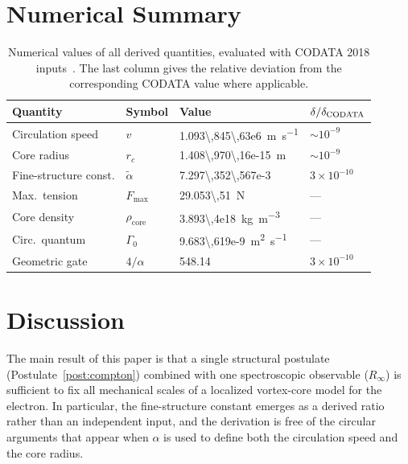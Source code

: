 \documentclass[aps,pra,preprint,longbibliography,nofootinbib]{revtex4-2}
\newcommand{\vc}{v}              %
\newcommand{\rc}{r_c}            %
\newcommand{\Rinf}{R_\infty}     %
\newcommand{\Fmax}{F_{\max}}     %
\newcommand{\rhocore}{\rho_{\mathrm{core}}} %
\newcommand{\Gz}{\Gamma_0}       %
\begin{document}
\section{Numerical Summary}
\label{sec:numerical}

\begin{table}[h]
\centering
\caption{Numerical values of all derived quantities, evaluated with
CODATA 2018 inputs~\cite{MohrTaylor2018}.
The last column gives the relative deviation from the corresponding
CODATA value where applicable.}
\label{tab:numbers}
\begin{tabular}{llll}
\toprule
Quantity & Symbol & Value & $\delta/\delta_{\rm CODATA}$ \\
\midrule
Circulation speed   & $\vc$         & \SI{1.093\,845\,63e6}{\meter\per\second}          & $\sim 10^{-9}$ \\
Core radius         & $\rc$         & \SI{1.408\,970\,16e-15}{\meter}                   & $\sim 10^{-9}$ \\
Fine-structure const.& $\tilde\alpha$ & \num{7.297\,352\,567e-3}                         & $3\times 10^{-10}$ \\
Max.\ tension       & $\Fmax$       & \SI{29.053\,51}{\newton}                          & — \\
Core density        & $\rhocore$    & \SI{3.893\,4e18}{\kilogram\per\cubic\meter}        & — \\
Circ.\ quantum      & $\Gz$         & \SI{9.683\,619e-9}{\meter\squared\per\second}     & — \\
Geometric gate      & $4/\alpha$    & \num{548.14}                                      & $3\times 10^{-10}$ \\
\bottomrule
\end{tabular}
\end{table}

\section{Discussion}
\label{sec:discussion}

The main result of this paper is that a single structural postulate
(Postulate~\ref{post:compton}) combined with one spectroscopic
observable ($\Rinf$) is sufficient to fix all mechanical scales of a
localized vortex-core model for the electron.
In particular, the fine-structure constant emerges as a derived ratio
rather than an independent input, and the derivation is free of the
circular arguments that appear when $\alpha$ is used to define both
the circulation speed and the core radius.
\end{document}
